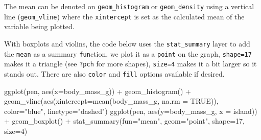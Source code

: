 \documentclass[
  letterpaper,
  DIV=11,
  numbers=noendperiod,
  oneside]{scrreprt}
\newenvironment{Shaded}{\begin{snugshade}}{\end{snugshade}}
\newcommand{\AttributeTok}[1]{\textcolor[rgb]{0.40,0.45,0.13}{#1}}
\newcommand{\ConstantTok}[1]{\textcolor[rgb]{0.56,0.35,0.01}{#1}}
\newcommand{\DecValTok}[1]{\textcolor[rgb]{0.68,0.00,0.00}{#1}}
\newcommand{\FunctionTok}[1]{\textcolor[rgb]{0.28,0.35,0.67}{#1}}
\newcommand{\NormalTok}[1]{\textcolor[rgb]{0.00,0.23,0.31}{#1}}
\newcommand{\SpecialCharTok}[1]{\textcolor[rgb]{0.37,0.37,0.37}{#1}}
\newcommand{\StringTok}[1]{\textcolor[rgb]{0.13,0.47,0.30}{#1}}
\begin{document}
The mean can be denoted on \texttt{geom\_histogram} or
\texttt{geom\_density} using a vertical line (\texttt{geom\_vline})
where the \texttt{xintercept} is set as the calculated mean of the
variable being plotted.

With boxplots and violins, the code below uses the
\texttt{stat\_summary} layer to add the \texttt{mean} as a summary
\texttt{fun}ction, we plot it as a \texttt{point} on the graph,
\texttt{shape=17} makes it a triangle (see \texttt{?pch} for more
shapes), \texttt{size=4} makes it a bit larger so it stands out. There
are also \texttt{color} and \texttt{fill} options available if desired.

\begin{Shaded}
\begin{Highlighting}[]
\FunctionTok{ggplot}\NormalTok{(pen, }\FunctionTok{aes}\NormalTok{(}\AttributeTok{x=}\NormalTok{body\_mass\_g)) }\SpecialCharTok{+} 
  \FunctionTok{geom\_histogram}\NormalTok{() }\SpecialCharTok{+} 
  \FunctionTok{geom\_vline}\NormalTok{(}\FunctionTok{aes}\NormalTok{(}\AttributeTok{xintercept=}\FunctionTok{mean}\NormalTok{(body\_mass\_g, }\AttributeTok{na.rm =} \ConstantTok{TRUE}\NormalTok{)),}
            \AttributeTok{color=}\StringTok{"blue"}\NormalTok{, }\AttributeTok{linetype=}\StringTok{"dashed"}\NormalTok{)}
\FunctionTok{ggplot}\NormalTok{(pen, }\FunctionTok{aes}\NormalTok{(}\AttributeTok{y=}\NormalTok{body\_mass\_g, }\AttributeTok{x =}\NormalTok{ island)) }\SpecialCharTok{+} 
  \FunctionTok{geom\_boxplot}\NormalTok{() }\SpecialCharTok{+} 
  \FunctionTok{stat\_summary}\NormalTok{(}\AttributeTok{fun=}\StringTok{"mean"}\NormalTok{, }\AttributeTok{geom=}\StringTok{"point"}\NormalTok{, }
               \AttributeTok{shape=}\DecValTok{17}\NormalTok{, }\AttributeTok{size=}\DecValTok{4}\NormalTok{) }
\end{Highlighting}
\end{Shaded}
\end{document}
